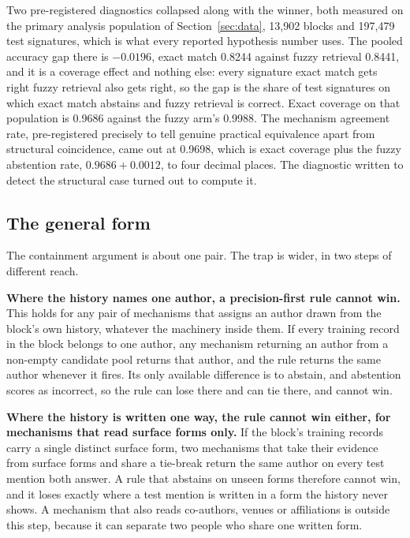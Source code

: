\documentclass[11pt]{article}
\begin{document}
Two pre-registered diagnostics collapsed along with the winner, both measured
on the primary analysis population of Section~\ref{sec:data}, 13{,}902 blocks
and 197{,}479 test signatures, which is what every reported hypothesis number
uses. The pooled accuracy gap there is $-0.0196$, exact match 0.8244 against
fuzzy retrieval 0.8441, and it is a coverage effect and nothing else: every
signature exact match gets right fuzzy retrieval also gets right, so the gap
is the share of test signatures on which exact match abstains and fuzzy
retrieval is correct. Exact coverage on that population is 0.9686 against the
fuzzy arm's 0.9988. The mechanism agreement rate, pre-registered precisely to
tell genuine practical equivalence apart from structural coincidence, came out
at 0.9698, which is exact coverage plus the fuzzy abstention rate,
$0.9686 + 0.0012$, to four decimal places. The diagnostic written to detect
the structural case turned out to compute it.

\subsection{The general form}
\label{sec:general-form}

The containment argument is about one pair. The trap is wider, in two steps
of different reach.

\textbf{Where the history names one author, a precision-first rule cannot
win.} This holds for any pair of mechanisms that assigns an author drawn from
the block's own history, whatever the machinery inside them. If every
training record in the block belongs to one author, any mechanism returning an
author from a non-empty candidate pool returns that author, and the rule
returns the same author whenever it fires. Its only available difference is to
abstain, and abstention scores as incorrect, so the rule can lose there and
can tie there, and cannot win.

\textbf{Where the history is written one way, the rule cannot win either, for
mechanisms that read surface forms only.} If the block's training records
carry a single distinct surface form, two mechanisms that take their evidence
from surface forms and share a tie-break return the same author on every test
mention both answer. A rule that abstains on unseen forms therefore cannot
win, and it loses exactly where a test mention is written in a form the
history never shows. A mechanism that also reads co-authors, venues or
affiliations is outside this step, because it can separate two people who
share one written form.
\end{document}

